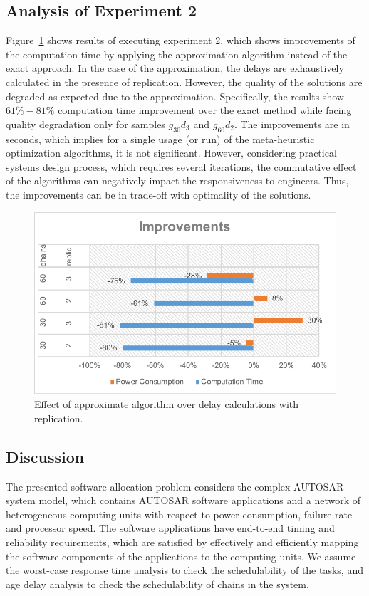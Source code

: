 \subsection{Analysis of Experiment 2}
Figure~\ref{fig_chainsreplicationimprovements} shows results of executing experiment 2, which shows improvements of the computation time by applying the approximation algorithm instead of the exact approach. In the case of the approximation, the delays are exhaustively calculated in the presence of replication. However, the quality of the solutions are degraded as expected due to the approximation. Specifically, the results show $61\%-81\%$ computation time improvement over the exact method while facing quality degradation only for samples $g_{30}d_{3}$ and  $g_{60}d_{2}$. The improvements are in seconds, which implies for a single usage (or run) of the meta-heuristic optimization algorithms, it is not significant. However, considering practical systems design process, which requires several iterations, the commutative effect of the algorithms can negatively impact the responsiveness to engineers. Thus, the improvements can be in trade-off with optimality of the solutions.
\begin{figure}
	\centering
	\includegraphics[width=0.7\linewidth]{img/chains_replication_improvements}
	\caption{Effect of approximate algorithm over delay calculations with replication.}
	\label{fig_chainsreplicationimprovements}
\end{figure}

\subsection{Discussion}
The presented software allocation problem considers the complex AUTOSAR system model, which contains AUTOSAR software applications and a network of heterogeneous computing units with respect to power consumption, failure rate and processor speed. The software applications have end-to-end timing and reliability requirements, which are satisfied by effectively and efficiently mapping the software components of the applications to the computing units. We assume the worst-case response time analysis to check the schedulability of the tasks, and age delay analysis to check the schedulability of chains in the system. 

